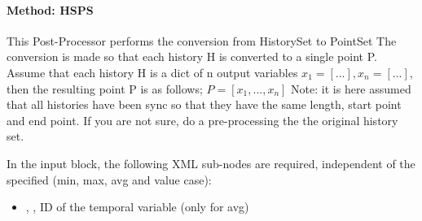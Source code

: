 \paragraph{Method: HSPS}

This Post-Processor performs the conversion from HistorySet to PointSet
The conversion is made so that each history H is converted to a single point P.
Assume that each history H is a dict of n output variables $x_1=[...],x_n=[...]$, then the resulting point P is as follows; $P=[x_1,...,x_n]$
Note: it is here assumed that all histories have been sync so that they have the same length, start point and end point. If you are not sure, do a pre-processing the the original history set.

In the  input block, the following XML sub-nodes are required,
independent of the  specified (min, max, avg and value case):

\begin{itemize}
   \item {}, , ID of the temporal variable (only for avg)
\end{itemize}



%
%

